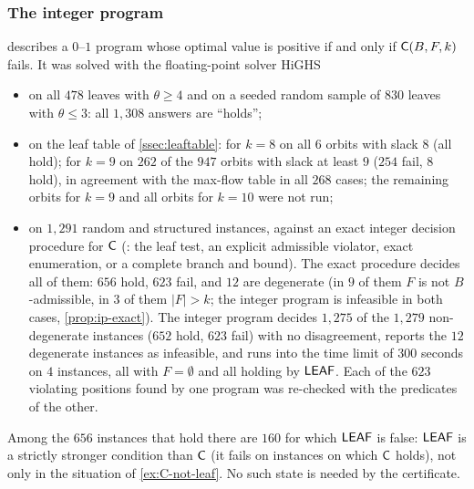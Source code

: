 \subsubsection*{The integer program}
 describes a $0$--$1$ program whose optimal value is positive if and only if $\mathsf{C}(B,F,k)$
fails. It was solved with the floating-point solver HiGHS~\cite{HuangfuHall2018}
\begin{itemize}[leftmargin=1.6em]
\item on all $478$ leaves with $\theta\ge4$ and on a seeded random sample of $830$ leaves with
  $\theta\le 3$: all $1{,}308$ answers are ``holds'';
\item on the leaf table of \cref{ssec:leaftable}: for $k=8$ on all $6$ orbits with slack $8$ (all hold); for
  $k=9$ on $262$ of the $947$ orbits with slack at least $9$ ($254$ fail, $8$ hold), in agreement with the
  max-flow table in all $268$ cases; the remaining orbits for $k=9$ and all orbits for $k=10$ were not run;
\item on $1{,}291$ random and structured instances, against an exact integer decision procedure for $\mathsf{C}$
  (: the leaf test, an explicit admissible violator, exact enumeration, or a complete branch
  and bound). The exact procedure decides all of them: $656$ hold, $623$ fail, and $12$ are degenerate
  (in $9$ of them $F$ is not $B$-admissible, in $3$ of them $|F|>k$; the integer program is infeasible in
  both cases, \cref{prop:ip-exact}). The integer program decides $1{,}275$ of the $1{,}279$ non-degenerate
  instances ($652$ hold,
  $623$ fail) with no disagreement, reports the $12$ degenerate instances as infeasible, and runs into the time
  limit of $300$ seconds on $4$ instances, all with $F=\emptyset$ and all holding by $\mathsf{LEAF}$. Each of the
  $623$ violating positions found by one program was re-checked with the predicates of the other.
\end{itemize}
Among the $656$ instances that hold there are $160$ for which $\mathsf{LEAF}$ is false: $\mathsf{LEAF}$ is a strictly
stronger condition than $\mathsf{C}$ (it fails on instances on which $\mathsf{C}$ holds), not only in the situation
of \cref{ex:C-not-leaf}. No such state is needed by the certificate.

